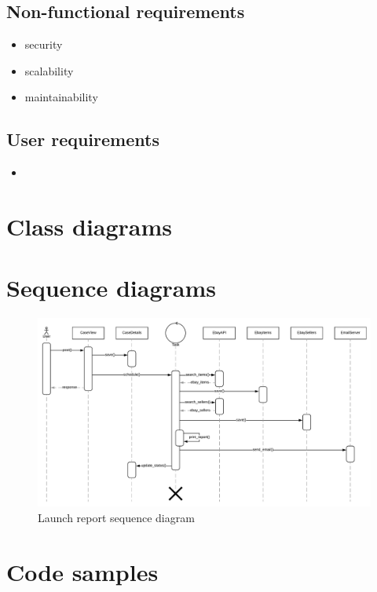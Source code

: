 \subsection{Non-functional requirements}

\begin{itemize}
  \item security
  \item scalability
  \item maintainability
\end{itemize}

\subsection{User requirements}
\begin{itemize}
  \item 
\end{itemize}

\section{Class diagrams}

\section{Sequence diagrams}

\begin{figure}[h!]
\centering
\includegraphics[angle=90, scale=0.6]{imgs/SequenceDiagram.pdf}
\caption{Launch report sequence diagram}
\label{fig:sqncdiag}
\end{figure}

\section{Code samples}
